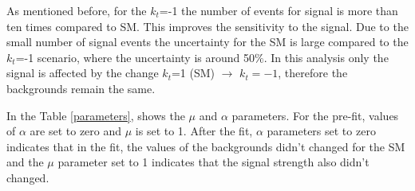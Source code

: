	As mentioned before, for the $k_t$=-1 the number of events for signal is more than ten times compared to SM. This improves the sensitivity to the signal. Due to the small number of signal events the uncertainty for the SM is large compared to the $k_t$=-1 scenario, where the uncertainty is around 50$\%$. In this analysis only the signal is affected by the change $k_t$=1 (SM) $\rightarrow$ $k_t=-1$, therefore the backgrounds remain the same.
	
	In the Table \ref{parameters}, shows the $\mu$ and $\alpha$ parameters. For the pre-fit, values of $\alpha$ are set to zero and $\mu$ is set to 1. After the fit, $\alpha$ parameters set to zero indicates that in the fit, the values of the backgrounds didn't changed for the SM and the $\mu$ parameter set to 1 indicates that the signal strength also didn't changed.
	
	\pagebreak
	
